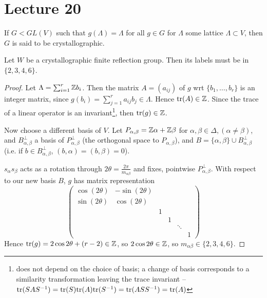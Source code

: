 \section{Lecture 20}

If $G < GL(V)$ such that $g(\Lambda) = \Lambda$ for all $g \in G$ for $\Lambda$
some lattice $\Lambda \subset V$, then $G$ is said to be crystallographic.

\begin{lemma} \label{cor19}
Let $W$ be a crystallographic finite reflection group. Then its labels must be
in $\{2, 3, 4, 6\}$.
\end{lemma}

\begin{proof}
Let $\Lambda = \sum_{i=1}^r \mathbb{Z} b_i$. Then the matrix $A = (a_{ij})$ of $g$ wrt
$\{b_1, \dots, b_r\}$ is an integer matrix, since $g(b_i) = \sum_{j=1}^r
a_{ij} b_j \in \Lambda$.
Hence ${\rm tr} (A) \in \mathbb{Z}$.
Since the trace of a linear operator is an invariant\footnote{does not depend
on the choice of basis; a change of basis corresponds to a similarity transformation
leaving the trace invariant -- ${\rm tr}(SAS^{-1}) = {\rm tr}(S){\rm tr}(A)
{\rm tr}(S^{-1}) = {\rm tr}(ASS^{-1}) = {\rm tr}(A)$}, then ${\rm tr}(g) \in \mathbb{Z}$.

Now choose a different basis of $V$. Let $P_{\alpha, \beta} = \mathbb{Z} \alpha +
\mathbb{Z} \beta$ for $\alpha, \beta \in \Delta, (\alpha \neq \beta)$, and
$B_{\alpha,\beta}^\perp$ a basis of $P_{\alpha, \beta}^\perp$ (the orthogonal
space to $P_{\alpha, \beta}$), and $B = \{\alpha, \beta\} \cup
B_{\alpha,\beta}^\perp$ (i.e. if $b \in B_{\alpha, \beta}^\perp$, $(b, \alpha)
= (b, \beta) = 0$).

$s_\alpha s_\beta$ acts as a rotation through $2\theta =
\frac{2\pi}{m_{\alpha \beta}}$ and fixes, pointwise $P_{\alpha, \beta}^\perp$.
With respect to our new basis $B$, $g$ has matrix representation
\[
    \begin{pmatrix}
        \cos (2\theta) & -\sin(2\theta) \\
        \sin (2\theta) & \cos(2\theta) \\
        & & 1 \\
        & & & 1 \\
        & & & & \ddots \\
        & & & & & 1
    \end{pmatrix}
\]
Hence ${\rm tr}(g) = 2 \cos 2\theta + (r-2) \in \mathbb{Z}$, so $2 \cos 2\theta \in \mathbb{Z}$,
so $m_{\alpha \beta} \in \{2,3,4,6\}$.
\end{proof}

